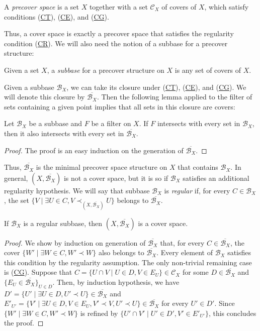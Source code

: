 \documentclass[reqno]{amsart}
\newcommand{\axref}[1]{(\hyperref[ax:#1]{#1})}
\theoremstyle{definition}
\theoremstyle{remark}
\numberwithin{figure}{section}
\newcommand{\rb}{\prec}
\begin{document}
\begin{defn}
A \emph{precover space} is a set $X$ together with a set $\mathcal{C}_X$ of covers of $X$, which satisfy conditions \axref{CT}, \axref{CE}, and \axref{CG}.
\end{defn}

Thus, a cover space is exactly a precover space that satisfies the regularity condition \axref{CR}.
We will also need the notion of a subbase for a precover structure:

\begin{defn}
Given a set $X$, a \emph{subbase} for a precover structure on $X$ is any set of covers of $X$.
\end{defn}

Given a subbase $\mathcal{B}_X$, we can take its closure under \axref{CT}, \axref{CE}, and \axref{CG}.
We will denote this closure by $\overline{\mathcal{B}_X}$.
Then the following lemma applied to the filter of sets containing a given point implies that all sets in this closure are covers:

\begin{lem}
Let $\mathcal{B}_X$ be a subbase and $F$ be a filter on $X$.
If $F$ intersects with every set in $\mathcal{B}_X$, then it also intersects with every set in $\overline{\mathcal{B}_X}$.
\end{lem}
\begin{proof}
The proof is an easy induction on the generation of $\overline{\mathcal{B}_X}$.
\end{proof}

Thus, $\overline{\mathcal{B}_X}$ is the minimal precover space structure on $X$ that contains $\mathcal{B}_X$.
In general, $(X,\overline{\mathcal{B}_X})$ is not a cover space, but it is so if $\mathcal{B}_X$ satisfies an additional regularity hypothesis.
We will say that subbase $\mathcal{B}_X$ is \emph{regular} if, for every $C \in \mathcal{B}_X$, the set $\{ V \mid \exists U \in C, V \rb_{(X,\overline{\mathcal{B}_X})} U \}$ belongs to $\overline{\mathcal{B}_X}$.

\begin{prop}
If $\mathcal{B}_X$ is a regular subbase, then $(X,\overline{\mathcal{B}_X})$ is a cover space.
\end{prop}
\begin{proof}
We show by induction on generation of $\overline{\mathcal{B}_X}$ that, for every $C \in \overline{\mathcal{B}_X}$, the cover $\{ W' \mid \exists W \in C, W' \rb W \}$ also belongs to $\overline{\mathcal{B}_X}$.
Every element of $\mathcal{B}_X$ satisfies this condition by the regularity assumption.
The only non-trivial remaining case is \axref{CG}.
Suppose that $C = \{ U \cap V \mid U \in D, V \in E_U \} \in \mathcal{C}_X$ for some $D \in \overline{\mathcal{B}_X}$ and $\{ E_U \in \overline{\mathcal{B}_X} \}_{U \in D}$.
Then, by induction hypothesis, we have $D' = \{ U' \mid \exists U \in D, U' \rb U \} \in \overline{\mathcal{B}_X}$ and $E'_{U'} = \{ V' \mid \exists U \in D, V \in E_U, V' \rb V, U' \rb U \} \in \overline{\mathcal{B}_X}$ for every $U' \in D'$.
Since $\{ W' \mid \exists W \in C, W' \rb W \}$ is refined by $\{ U' \cap V' \mid U' \in D', V' \in E'_{U'} \}$, this concludes the proof.
\end{proof}
\end{document}
